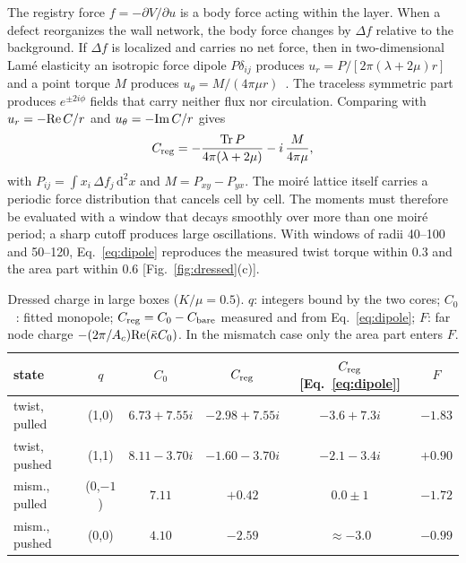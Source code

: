 \documentclass[prb,twocolumn,superscriptaddress,floatfix,10pt]{revtex4-2}
\newcommand{\dd}{\mathrm{d}}
\begin{document}
The registry force $f=-\partial V/\partial u$ is a body force acting within the layer. When a defect reorganizes the wall network, the body force changes by $\Delta f$ relative to the background. If $\Delta f$ is localized and carries no net force, then in two-dimensional Lam\'e elasticity an isotropic force dipole $P\delta_{ij}$ produces $u_r=P/[2\pi(\lambda+2\mu)r]$ and a point torque $M$ produces $u_\theta=M/(4\pi\mu r)$~\cite{Landau1986}. The traceless symmetric part produces $e^{\pm2i\phi}$ fields that carry neither flux nor circulation. Comparing with $u_r=-{\rm Re}\,C/r$ and $u_\theta=-{\rm Im}\,C/r$ gives
\begin{equation}
C_{\rm reg}=-\frac{{\rm Tr}\,P}{4\pi(\lambda+2\mu)}-i\,\frac{M}{4\pi\mu},
\label{eq:dipole}
\end{equation}
with $P_{ij}=\int x_i\,\Delta f_j\,\dd^2x$ and $M=P_{xy}-P_{yx}$.
The moir\'e lattice itself carries a periodic force distribution that cancels cell by cell. The moments must therefore be evaluated with a window that decays smoothly over more than one moir\'e period; a sharp cutoff produces large oscillations. With windows of radii 40--100 and 50--120, Eq.~\eqref{eq:dipole} reproduces the measured twist torque within $0.3$ and the area part within $0.6$ [Fig.~\ref{fig:dressed}(c)].

\begin{table}[t]
\caption{Dressed charge in large boxes ($K/\mu=0.5$). $q$: integers bound by the two cores; $C_0$: fitted monopole; $C_{\rm reg}=C_0-C_{\rm bare}$ measured and from Eq.~\eqref{eq:dipole}; $F$: far node charge $-(2\pi/A_c){\rm Re}(\bar\kappa C_0)$. In the mismatch case only the area part enters $F$.}
\label{tab:creg}
\begin{ruledtabular}
\begin{tabular}{lccccc}
state & $q$ & $C_0$ & $C_{\rm reg}$ & $C_{\rm reg}$ [Eq.~\eqref{eq:dipole}] & $F$\\
\hline
twist, pulled & (1,0) & $6.73+7.55i$ & $-2.98+7.55i$ & $-3.6+7.3i$ & $-1.83$\\
twist, pushed & (1,1) & $8.11-3.70i$ & $-1.60-3.70i$ & $-2.1-3.4i$ & $+0.90$\\
mism., pulled & (0,$-1$) & $7.11$ & $+0.42$ & $0.0\pm1$ & $-1.72$\\
mism., pushed & (0,0) & $4.10$ & $-2.59$ & $\approx-3.0$ & $-0.99$\\
\end{tabular}
\end{ruledtabular}
\end{table}
\end{document}
